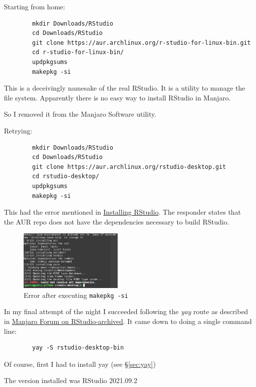 \documentclass[]{scrartcl}
\begin{document}
	Starting from home:
	
	\begin{verbatim}
		mkdir Downloads/RStudio
		cd Downloads/RStudio
		git clone https://aur.archlinux.org/r-studio-for-linux-bin.git
		cd r-studio-for-linux-bin/
		updpkgsums
		makepkg -si	
	\end{verbatim}
	
	This is a deceivingly namesake of the real RStudio. It is a utility to manage the file system.
	Apparently there is no easy way to install RStudio in Manjaro.
	
	So I removed it from the Manjaro Software utility.
	
	Retrying:
	
	\begin{verbatim}
		mkdir Downloads/RStudio
		cd Downloads/RStudio
		git clone https://aur.archlinux.org/rstudio-desktop.git
		cd rstudio-desktop/
		updpkgsums
		makepkg -si	
	\end{verbatim}
	
	This had the error mentioned in \href{https://forum.manjaro.org/t/rstudio-on-pinebook-pro-aarch64/60827/6?u=padames}{Installing RStudio}. The responder states that the AUR repo does not have the dependencies necessary to build RStudio.
	
	\begin{figure}[!htb]
		\centering
		\caption{Error after executing \texttt{makepkg -si}}
		\includegraphics[width=0.45\textwidth]{Images/ErrorInstallingAUR.png}
	\end{figure}
	
	In my final attempt of the night I succeeded following the \textit{yay} route as described in \href{https://archived.forum.manjaro.org/t/using-the-statistical-package-r-in-manjaro-with-rstudio/484}{Manjaro Forum on RStudio-archived}. 
	It came down to doing a single command line:
	\begin{verbatim}
		yay -S rstudio-desktop-bin
	\end{verbatim}
	Of course, first I had to install yay (see \S\ref{sec:yay})
	
	The version installed was RStudio 2021.09.2
	
\end{document}
